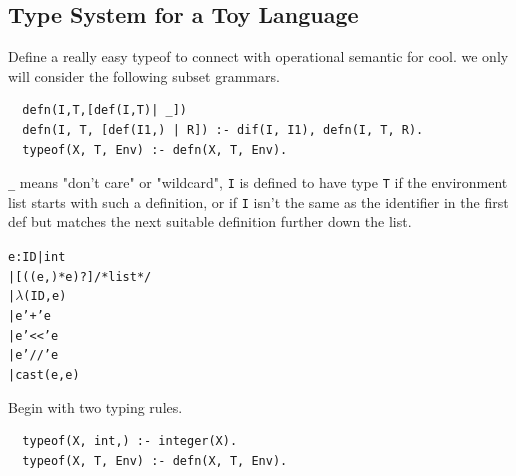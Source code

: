 \documentclass[a4paper]{exam}
\begin{document}
\subsection{Type System for a Toy Language}
Define \cite{cs164lec12} a really easy typeof to connect with operational semantic for cool. we only will consider the following subset grammars.
\begin{verbatim}
  defn(I,T,[def(I,T)| _])
  defn(I, T, [def(I1,) | R]) :- dif(I, I1), defn(I, T, R).
  typeof(X, T, Env) :- defn(X, T, Env).
  \end{verbatim}
\texttt{\_} means "don't care" or "wildcard", \texttt{I} is defined to have type \texttt{T} if the environment list starts with such a definition, or if \texttt{I} isn't the same as the identifier in the first def but matches the next suitable definition further down the list.
\begin{alltt}
  e : ID | int
  | [ ((e ,)* e)?  ] /* list */
  | \(\lambda\) ( ID , e )
  | e '+' e
  | e '<<' e
  | e '//' e
  | cast(e,e)
\end{alltt}

Begin with two typing rules.
\begin{verbatim}
  typeof(X, int,) :- integer(X).
  typeof(X, T, Env) :- defn(X, T, Env).
\end{verbatim}
\end{document}
